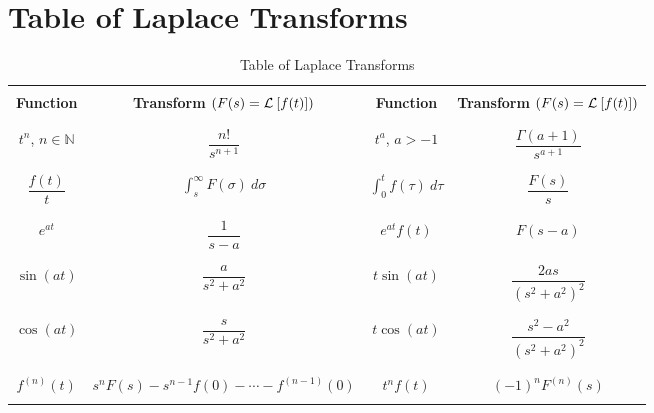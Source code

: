 \documentclass[oneside]{book}
\begin{document}
    

\chapter*{}

\vspace*{\fill}
\begin{center}
\end{center}
\vspace*{\fill}

\appendix
\appendixpage
\noappendicestocpagenum
\addappheadtotoc

\chapter{Table of Laplace Transforms}
\begin{table}[h!]
    \centering
    \begin{tabular}{|c|c||c|c|}
    \hline
    \hspace{5em}&\hspace{15em} &\hspace{5em} &\hspace{15em} \\
    \textbf{Function} & \textbf{Transform \(\left(F(s)=\mathcal{L}^{}\left[f(t)\right]\right)\)} & \textbf{Function} & \textbf{Transform \(\left(F(s)=\mathcal{L}^{}\left[f(t)\right]\right)\)} \\
    & & & \\\hline \hline
    & & & \\
    $t^n$, $n\in\mathbb{N}$& $\dfrac{n!}{s^{n+1}}$ & $t^{a}$, $a>-1$ & $\dfrac{\Gamma(a+1)}{s^{a+1}}$ \\
    & & & \\\hline
    & & & \\
    $\dfrac{f(t)}{t}$&$\displaystyle\int_{s}^{\infty}F(\sigma)\ d\sigma$ & $\displaystyle\int_{0}^{t}f(\tau)\ d\tau $ &$\dfrac{F(s)}{s}$  \\
    & & & \\\hline
    & & & \\
    $e^{at}$ & $\dfrac{1}{s-a}$ & $e^{at}f(t)$ &$F(s-a)$ \\
    & & & \\\hline
    & & & \\
    $\sin(at)$ &$\dfrac{a}{s^2+a^2}$ & $t\sin(at)$&$\dfrac{2as}{(s^2+a^2)^2} $ \\
    & & & \\\hline
    & & & \\
    $\cos(at)$ &$\dfrac{s}{s^2+a^2}$ & $t\cos(at)$ & $\dfrac{s^2-a^2}{(s^2+a^2)^2}$ \\
    & & & \\\hline
    & & & \\
    $f^{(n)}(t)$& $s^nF(s)-s^{n-1}f(0)-\cdots-f^{(n-1)}(0)$ & $t^nf(t)$& $(-1)^{n}F^{(n)}(s)$ \\
    & & & \\\hline
    \end{tabular}
    \caption{Table of Laplace Transforms}
    \label{table:laplace}
\end{table}
\end{document}
